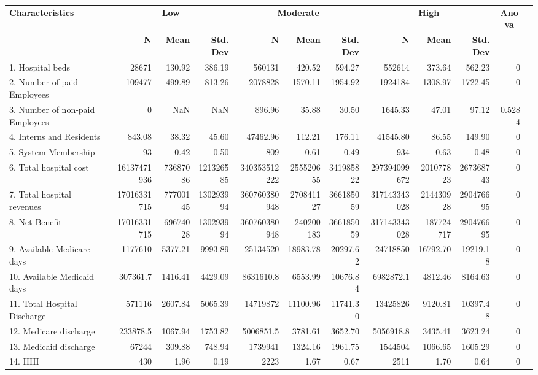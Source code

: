 \documentclass[
]{article}
\author{}
\date{\vspace{-2.5em}}
\begin{document}
\begin{tabular}{p{3cm}rrr|rrr|rrr|rr}
                    \textbf{Characteristics} & \multicolumn{3}{c}{\textbf{Low}} & \multicolumn{3}{c}{\textbf{Moderate}} & \multicolumn{3}{c}{\textbf{High}} & \multicolumn{1}{c}{\textbf{Anova}} \\
                    \cmidrule(lr){2-4} \cmidrule(lr){5-7} \cmidrule(lr){8-10} \cmidrule(lr){11-11}
                    & \textbf{N} & \textbf{Mean} & \textbf{Std. Dev} & \textbf{N} & \textbf{Mean} & \textbf{Std. Dev} & \textbf{N} & \textbf{Mean} & \textbf{Std. Dev} & \\
                    \midrule
                    1. Hospital beds & 28671 & 130.92 & 386.19 & 560131 & 420.52 & 594.27 & 552614 & 373.64 & 562.23 & 0 \\
                    2. Number of paid Employees & 109477 & 499.89 & 813.26 & 2078828 & 1570.11 & 1954.92 & 1924184 & 1308.97 & 1722.45 & 0 \\
                    3. Number of non-paid Employees & 0 & NaN & NaN & 896.96 & 35.88 & 30.50 & 1645.33 & 47.01 & 97.12 & 0.5284 \\
                    4. Interns and Residents & 843.08 & 38.32 & 45.60 & 47462.96 & 112.21 & 176.11 & 41545.80 & 86.55 & 149.90 & 0 \\
                    5. System Membership & 93 & 0.42 & 0.50 & 809 & 0.61 & 0.49 & 934 & 0.63 & 0.48 & 0 \\
                    \midrule
                    6. Total hospital cost & 16137471936 & 73687086 & 121326585 & 340353512222 & 255520655 & 341985822 & 297394099672 & 201077823 & 267368743 & 0 \\
                    7. Total hospital revenues & 17016331715 & 77700145 & 130293994 & 360760380948 & 270841127 & 366185059 & 317143343028 & 214430928 & 290476695 & 0 \\
                    8. Net Benefit & -17016331715 & -69674028 & 130293994 & -360760380948 & -240200183 & 366185059 & -317143343028 & -187724717 & 290476695 & 0 \\
                    9. Available Medicare days & 1177610 & 5377.21 & 9993.89 & 25134520 & 18983.78 & 20297.62 & 24718850 & 16792.70 & 19219.18 & 0 \\
                    10. Available Medicaid days & 307361.7 & 1416.41 & 4429.09 & 8631610.8 & 6553.99 & 10676.84 & 6982872.1 & 4812.46 & 8164.63 & 0 \\
                    11. Total Hospital Discharge & 571116 & 2607.84 & 5065.39 & 14719872 & 11100.96 & 11741.30 & 13425826 & 9120.81 & 10397.48 & 0 \\
                    12. Medicare discharge & 233878.5 & 1067.94 & 1753.82 & 5006851.5 & 3781.61 & 3652.70 & 5056918.8 & 3435.41 & 3623.24 & 0 \\
                    13. Medicaid discharge & 67244 & 309.88 & 748.94 & 1739941 & 1324.16 & 1961.75 & 1544504 & 1066.65 & 1605.29 & 0 \\
                    14. HHI & 430 & 1.96 & 0.19 & 2223 & 1.67 & 0.67 & 2511 & 1.70 & 0.64 & 0 \\
                    \bottomrule
                \end{tabular}
\end{document}
